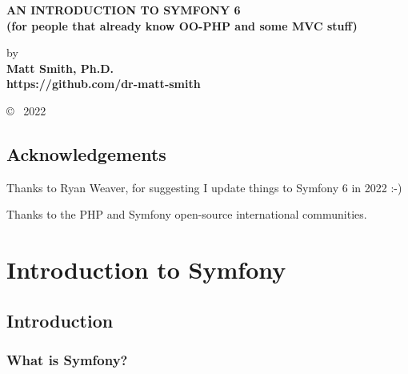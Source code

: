 \documentclass[a4paperpaper,openright]{book}
\date{}
\begin{document}
\begin{titlepage}
    \begin{center}
    
        \vspace*{1cm}
        

       \large{ \textbf{ \uppercase{An Introduction to Symfony 6}\\(for people that already know OO-PHP and some MVC stuff)}}
        
        \vspace{1.5cm}

        by\\
        \textbf{
        Matt Smith, Ph.D.\\https://github.com/dr-matt-smith
        }

       

        
        
        \vfill
  
            \copyright ~ 2022

     \end{center}
    \thispagestyle{empty}
\end{titlepage}

\newpage
\thispagestyle{empty}
\mbox{}

\frontmatter

\chapter{Acknowledgements}

Thanks to Ryan Weaver, for suggesting I update things to Symfony 6 in
2022 :-)

Thanks to the PHP and Symfony open-source international communities.

\tableofcontents

\mainmatter

\part{Introduction to Symfony}

\hypertarget{introduction}{%
\chapter{Introduction}\label{introduction}}

\hypertarget{what-is-symfony}{%
\section{What is Symfony?}\label{what-is-symfony}}
\end{document}
